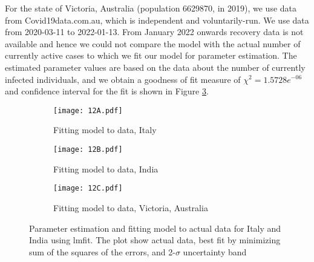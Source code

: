 \documentclass[10pt]{wlscirep}
\begin{document}
For the state of Victoria, Australia (population 6629870, in 2019), we use data from Covid19data.com.au, which is independent and voluntarily-run. We use data from 2020-03-11 to 2022-01-13. From January 2022 onwards  recovery data is not available and hence we could not compare the model with the actual number of currently active cases  to which we fit our model for parameter estimation.
 The estimated parameter values are based on the data about the number of currently infected individuals, and we obtain a goodness of fit measure of $\chi^2= 1.5728e^{-06}$ and confidence interval for the fit is shown in Figure \ref{fig-fitness-1C}. 
%
\begin{figure*}[t!]
	\centering
	\begin{subfigure}{0.5\textwidth}
		\centering
		\texttt{[image: 12A.pdf]}
		\caption{Fitting model to data, Italy}
		\label{fig-fitness-1A}
	\end{subfigure}%
	\begin{subfigure}{0.5\textwidth}
		\centering
		\texttt{[image: 12B.pdf]}
		\caption{Fitting model to data, India}
		\label{fig-fitness-1B}
	\end{subfigure}
\begin{subfigure}{0.5\textwidth}
	\centering
	\texttt{[image: 12C.pdf]}
	\caption{Fitting model to data, Victoria, Australia}
	\label{fig-fitness-1C}
\end{subfigure}
	\caption{Parameter estimation and fitting model to actual data for Italy and India using lmfit. The plot show actual data, best fit by minimizing sum of the squares of the errors, and 2-$\sigma$ uncertainty band  }
	\label{fig-fitness-1}
\end{figure*}
\end{document}
